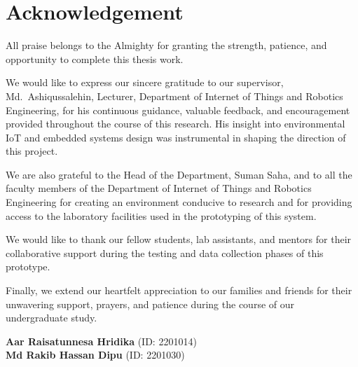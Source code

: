 \chapter*{Acknowledgement}

All praise belongs to the Almighty for granting the strength, patience, and opportunity to complete this thesis work.

We would like to express our sincere gratitude to our supervisor, Md.\ Ashiqussalehin, Lecturer, Department of Internet of Things and Robotics Engineering, for his continuous guidance, valuable feedback, and encouragement provided throughout the course of this research. His insight into environmental IoT and embedded systems design was instrumental in shaping the direction of this project.

We are also grateful to the Head of the Department, Suman Saha, and to all the faculty members of the Department of Internet of Things and Robotics Engineering for creating an environment conducive to research and for providing access to the laboratory facilities used in the prototyping of this system.

We would like to thank our fellow students, lab assistants, and mentors for their collaborative support during the testing and data collection phases of this prototype.

Finally, we extend our heartfelt appreciation to our families and friends for their unwavering support, prayers, and patience during the course of our undergraduate study.

\vspace{1.2cm}
\noindent
\textbf{Aar Raisatunnesa Hridika} (ID: 2201014)\\[0.2cm]
\textbf{Md Rakib Hassan Dipu} (ID: 2201030)
